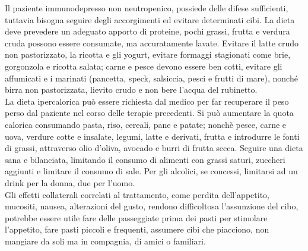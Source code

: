 Il paziente immunodepresso non neutropenico, possiede delle difese sufficienti, tuttavia bisogna seguire degli 
accorgimenti ed evitare determinati cibi. La dieta deve prevedere 
un adeguato apporto di proteine, pochi grassi, frutta e verdura cruda possono essere consumate, ma accuratamente 
lavate. Evitare il latte crudo non pastorizzato, la ricotta e gli yogurt, evitare formaggi stagionati come 
brie, gorgonzola e ricotta salata; carne e pesce devono essere ben cotti, evitare gli affumicati e i 
marinati (pancetta, speck, salsiccia, pesci e frutti di mare), nonché birra non pastorizzata, lievito crudo e
non bere l’acqua del rubinetto\cite{DIETA}.\\
La dieta ipercalorica può essere richiesta dal medico per far recuperare il peso perso dal paziente nel corso delle 
terapie precedenti. Si può aumentare la quota calorica consumando pasta, riso, cereali, pane e patate; 
nonchè pesce, carne e uova, verdure cotte e insalate, legumi, latte e derivati, frutta e introdurre le fonti di grassi, 
attraverso olio d’oliva, avocado e burri di frutta secca\cite{DIETA}. 
Seguire una dieta sana e bilanciata, limitando il consumo di alimenti con grassi 
saturi, zuccheri aggiunti e limitare il consumo di sale. Per gli alcolici, se concessi, 
limitarsi ad un drink per la donna, due per l’uomo\cite{LLSNUTRITION}.\\
Gli effetti collaterali correlati al trattamento, come perdita dell’appetito, mucositi, nausea, alterazioni del 
gusto, rendono difficoltosa l’assunzione del cibo, potrebbe essere utile fare delle passeggiate prima dei pasti per 
stimolare l’appetito, fare pasti piccoli e frequenti, assumere cibi che piacciono, non mangiare da soli ma in compagnia, di 
amici o familiari\cite{LLSNUTRITION}.

